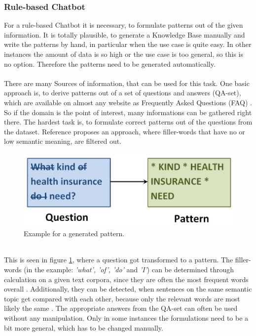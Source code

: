 \documentclass[10pt,final,journal,a4paper,oneside,twocolumn]{IEEEtran}
\begin{document}
\subsubsection{Rule-based Chatbot}
For a rule-based Chatbot it is necessary, to formulate patterns out of the given information. It is totally plausible, to generate a Knowledge Base manually and write the patterns by hand, in particular when the use case is quite easy. In other instances the amount of data is so high or the use case is too general, so this is no option. Therefore the patterns need to be generated automatically.\\
\\
There are many Sources of information, that can be used for this task. One basic approach is, to derive patterns out of a set of questions and answers (QA-set), which are available on almost any website as Frequently Asked Questions (FAQ) \cite{b16}. So if the domain is the point of interest, many informations can be gathered right there. The hardest task is, to formulate correct patterns out of the questions from the dataset. Reference \cite{b16} proposes an approach, where filler-words that have no or low semantic meaning, are filtered out.
\begin{figure}[htbp]
	\centerline{\includegraphics[width=1\linewidth]{pictures/knowledge.jpg}}
	\caption{Example for a generated pattern.}
	\label{knowledge}
\end{figure}
\\This is seen in figure \ref{knowledge}, where a question got transformed to a pattern. The filler-words (in the example: \textit{'what', 'of', 'do'} and \textit{'I'}) can be determined through calculation on a given text corpora, since they are often the most frequent words overall \cite{b16}. Additionally, they can be detected, when sentences on the same semantic topic get compared with each other, because only the relevant words are most likely the same \cite{b16}. The appropriate answers from the QA-set can often be used without any manipulation. Only in some instances the formulations need to be a bit more general, which has to be changed manually.\\
\end{document}
